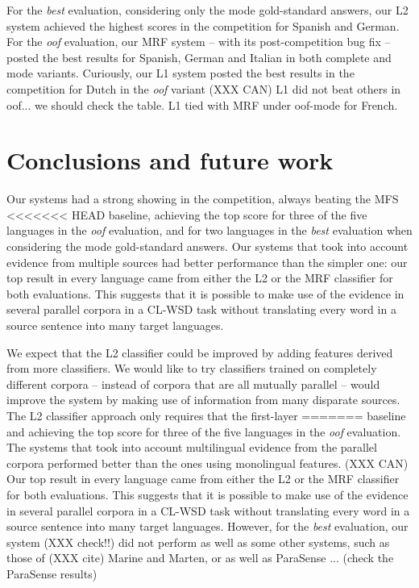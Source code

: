 \documentclass[11pt,letterpaper]{article}
\begin{document}
For the \emph{best} evaluation, considering only the mode gold-standard
answers, our L2 system achieved the highest scores in the competition for
Spanish and German. For the \emph{oof} evaluation, our MRF system -- with its
post-competition bug fix -- posted the best results for Spanish, German and
Italian in both complete and mode variants. 
Curiously, our L1 system posted the best results in the competition for Dutch in the \emph{oof} variant 
(XXX CAN) L1 did not beat others in oof... we should check the table.
L1 tied with MRF under oof-mode for French. 


\section{Conclusions and future work}
Our systems had a strong showing in the competition, always beating the MFS
<<<<<<< HEAD
baseline, achieving the top score for three of the five languages in the
\emph{oof} evaluation, and for two languages in the \emph{best} evaluation when
considering the mode gold-standard answers. Our systems that took into account
evidence from multiple sources had better performance than the simpler one: our
top result in every language came from either the L2 or the MRF classifier for
both evaluations. This suggests that it is possible to make use of the evidence
in several parallel corpora in a CL-WSD task without translating every word in
a source sentence into many target languages.

We expect that the L2 classifier could be improved by adding features derived
from more classifiers. We would like to try classifiers trained on completely
different corpora -- instead of corpora that are all mutually parallel -- would
improve the system by making use of information from many disparate sources.
The L2 classifier approach only requires that the first-layer
=======
baseline and achieving the top score for three of the five languages in the
\emph{oof} evaluation. The systems that took into account 
multilingual evidence from the parallel corpora performed better than the ones 
using monolingual features. (XXX CAN)
Our top result in every language came from either the L2 or the MRF classifier for
both evaluations. This suggests that it is possible to make use of the evidence
in several parallel corpora in a CL-WSD task without translating every word in
a source sentence into many target languages. However, for the \emph{best}
evaluation, our system (XXX check!!) did not perform as well as some other
systems, such as those of (XXX cite) Marine and Marten, or as well as ParaSense
... (check the ParaSense results)
\end{document}
